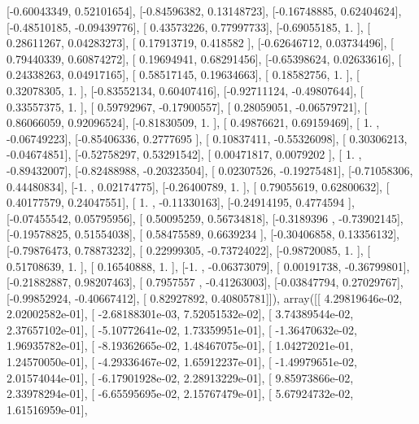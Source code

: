 \documentclass{article}
\begin{document}
       [-0.60043349,  0.52101654],
       [-0.84596382,  0.13148723],
       [-0.16748885,  0.62404624],
       [-0.48510185, -0.09439776],
       [ 0.43573226,  0.77997733],
       [-0.69055185,  1.        ],
       [ 0.28611267,  0.04283273],
       [ 0.17913719,  0.418582  ],
       [-0.62646712,  0.03734496],
       [ 0.79440339,  0.60874272],
       [ 0.19694941,  0.68291456],
       [-0.65398624,  0.02633616],
       [ 0.24338263,  0.04917165],
       [ 0.58517145,  0.19634663],
       [ 0.18582756,  1.        ],
       [ 0.32078305,  1.        ],
       [-0.83552134,  0.60407416],
       [-0.92711124, -0.49807644],
       [ 0.33557375,  1.        ],
       [ 0.59792967, -0.17900557],
       [ 0.28059051, -0.06579721],
       [ 0.86066059,  0.92096524],
       [-0.81830509,  1.        ],
       [ 0.49876621,  0.69159469],
       [ 1.        , -0.06749223],
       [-0.85406336,  0.2777695 ],
       [ 0.10837411, -0.55326098],
       [ 0.30306213, -0.04674851],
       [-0.52758297,  0.53291542],
       [ 0.00471817,  0.0079202 ],
       [ 1.        , -0.89432007],
       [-0.82488988, -0.20323504],
       [ 0.02307526, -0.19275481],
       [-0.71058306,  0.44480834],
       [-1.        ,  0.02174775],
       [-0.26400789,  1.        ],
       [ 0.79055619,  0.62800632],
       [ 0.40177579,  0.24047551],
       [ 1.        , -0.11330163],
       [-0.24914195,  0.4774594 ],
       [-0.07455542,  0.05795956],
       [ 0.50095259,  0.56734818],
       [-0.3189396 , -0.73902145],
       [-0.19578825,  0.51554038],
       [ 0.58475589,  0.6639234 ],
       [-0.30406858,  0.13356132],
       [-0.79876473,  0.78873232],
       [ 0.22999305, -0.73724022],
       [-0.98720085,  1.        ],
       [ 0.51708639,  1.        ],
       [ 0.16540888,  1.        ],
       [-1.        , -0.06373079],
       [ 0.00191738, -0.36799801],
       [-0.21882887,  0.98207463],
       [ 0.7957557 , -0.41263003],
       [-0.03847794,  0.27029767],
       [-0.99852924, -0.40667412],
       [ 0.82927892,  0.40805781]]), array([[  4.29819646e-02,   2.02002582e-01],
       [ -2.68188301e-03,   7.52051532e-02],
       [  3.74389544e-02,   2.37657102e-01],
       [ -5.10772641e-02,   1.73359951e-01],
       [ -1.36470632e-02,   1.96935782e-01],
       [ -8.19362665e-02,   1.48467075e-01],
       [  1.04272021e-01,   1.24570050e-01],
       [ -4.29336467e-02,   1.65912237e-01],
       [ -1.49979651e-02,   2.01574044e-01],
       [ -6.17901928e-02,   2.28913229e-01],
       [  9.85973866e-02,   2.33978294e-01],
       [ -6.65595695e-02,   2.15767479e-01],
       [  5.67924732e-02,   1.61516959e-01],
\end{document}
